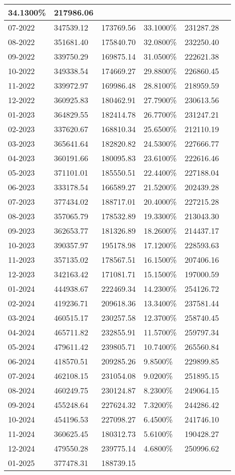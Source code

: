 \documentclass{report}
\begin{document}
\begin{longtable}[c]{|p{1.7cm}|p{2.6cm}|p{2.6cm}|p{2.3cm}|p{2.3cm}|c|}
34.1300\% & 217986.06\\ \hline07-2022 & 347539.12 & 173769.56 & 33.1000\% & 231287.28\\ \hline08-2022 & 351681.40 & 175840.70 & 32.0800\% & 232250.40\\ \hline09-2022 & 339750.29 & 169875.14 & 31.0500\% & 222621.38\\ \hline10-2022 & 349338.54 & 174669.27 & 29.8800\% & 226860.45\\ \hline11-2022 & 339972.97 & 169986.48 & 28.8100\% & 218959.59\\ \hline12-2022 & 360925.83 & 180462.91 & 27.7900\% & 230613.56\\ \hline01-2023 & 364829.55 & 182414.78 & 26.7700\% & 231247.21\\ \hline02-2023 & 337620.67 & 168810.34 & 25.6500\% & 212110.19\\ \hline03-2023 & 365641.64 & 182820.82 & 24.5300\% & 227666.77\\ \hline04-2023 & 360191.66 & 180095.83 & 23.6100\% & 222616.46\\ \hline05-2023 & 371101.01 & 185550.51 & 22.4400\% & 227188.04\\ \hline06-2023 & 333178.54 & 166589.27 & 21.5200\% & 202439.28\\ \hline07-2023 & 377434.02 & 188717.01 & 20.4000\% & 227215.28\\ \hline08-2023 & 357065.79 & 178532.89 & 19.3300\% & 213043.30\\ \hline09-2023 & 362653.77 & 181326.89 & 18.2600\% & 214437.17\\ \hline10-2023 & 390357.97 & 195178.98 & 17.1200\% & 228593.63\\ \hline11-2023 & 357135.02 & 178567.51 & 16.1500\% & 207406.16\\ \hline12-2023 & 342163.42 & 171081.71 & 15.1500\% & 197000.59\\ \hline01-2024 & 444938.67 & 222469.34 & 14.2300\% & 254126.72\\ \hline02-2024 & 419236.71 & 209618.36 & 13.3400\% & 237581.44\\ \hline03-2024 & 460515.17 & 230257.58 & 12.3700\% & 258740.45\\ \hline04-2024 & 465711.82 & 232855.91 & 11.5700\% & 259797.34\\ \hline05-2024 & 479611.42 & 239805.71 & 10.7400\% & 265560.84\\ \hline06-2024 & 418570.51 & 209285.26 & 9.8500\% & 229899.85\\ \hline07-2024 & 462108.15 & 231054.08 & 9.0200\% & 251895.15\\ \hline08-2024 & 460249.75 & 230124.87 & 8.2300\% & 249064.15\\ \hline09-2024 & 455248.64 & 227624.32 & 7.3200\% & 244286.42\\ \hline10-2024 & 454196.53 & 227098.27 & 6.4500\% & 241746.10\\ \hline11-2024 & 360625.45 & 180312.73 & 5.6100\% & 190428.27\\ \hline12-2024 & 479550.28 & 239775.14 & 4.6800\% & 250996.62\\ \hline01-2025 & 377478.31 & 188739.15 & 
\end{longtable}
\end{document}

